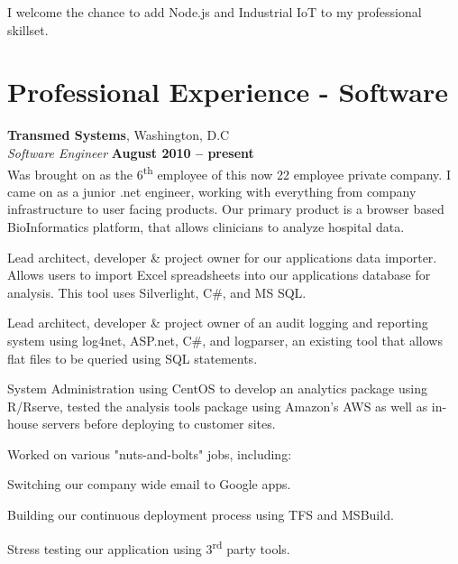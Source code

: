\documentclass[margin,line]{resume}
\begin{document}
\begin{resume}
	I welcome the chance to add Node.js and Industrial IoT to my professional skillset.
\section{\mysidestyle Professional Experience - Software}

    \textbf{Transmed Systems}, Washington, D.C \vspace{1mm}\\\vspace{1mm}%
    \textsl{Software Engineer} \hfill \textbf{August 2010 -- present}\vspace{1mm}\\\vspace{0mm}%
	Was brought on as the 6\textsuperscript{th} employee of this now 22 employee private company. I came on as a junior .net engineer, working with everything from company infrastructure to user facing products. Our primary product is a browser based BioInformatics platform, that allows clinicians to analyze hospital data.
\vspace{-3mm}\\\vspace{1mm}
    \begin{list2}
    \item Lead architect, developer \& project owner for our applications data importer. Allows users to import Excel spreadsheets into our applications database for analysis. This tool uses Silverlight, C\#, and MS SQL.
    \item Lead architect, developer \& project owner of an audit logging and reporting system using log4net, ASP.net, C\#, and logparser, an existing tool that allows flat files to be queried using SQL statements.
    \item System Administration using CentOS to develop an analytics package using R/Rserve, tested the analysis tools package using Amazon's AWS as well as in-house servers before deploying to customer sites.
  \end{list2}
Worked on various "nuts-and-bolts" jobs, including:
\begin{list2}
    \item Switching our company wide email to Google apps.
    \item Building our continuous deployment process using TFS and MSBuild.
    \item Stress testing our application using 3\textsuperscript{rd} party tools.
  \end{list2}
	

\end{resume}
\end{document}
